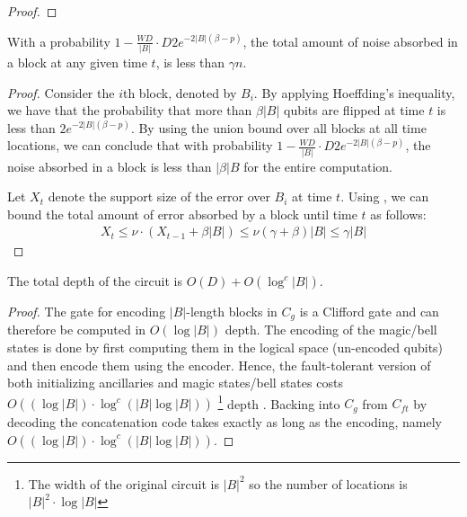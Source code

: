 \documentclass[manuscript,screen,review]{acmart}
\begin{document}
{\begin{proof}
\end{proof}

\begin{claim}
  \label{claim:prob}
  With a probability $ 1 - \frac{WD}{|B|} \cdot D 2e^{-2|B|(\beta - p)} $, the total amount of noise absorbed in a block at any given time $t$, is less than $\gamma n$. 
\end{claim}
\begin{proof}
Consider the $i$th block, denoted by $B_{i}$. By applying Hoeffding's inequality, we have that the probability that more than $\beta |B|$ qubits are flipped at time $t$ is less than $2e^{-2|B|(\beta - p)}$. By using the union bound over all blocks at all time locations, we can conclude that with probability $1 - \frac{WD}{|B|} \cdot D 2e^{-2|B|(\beta - p)}$, the noise absorbed in a block is less than $|\beta|B$ for the entire computation.

Let $X_{t}$ denote the support size of the error over $B_{i}$ at time $t$. Using , we can bound the total amount of error absorbed by a block until time $t$ as follows:
\begin{equation*}
\begin{split}
X_{t} \le \nu \cdot (X_{t-1} + \beta |B| ) \le \nu(\gamma+\beta) |B| \le \gamma |B|
\end{split}
\end{equation*}
\end{proof}


\begin{claim}
  The total depth of the circuit is $O ( D  ) + O ( \log^{c} |B| )$. 
\end{claim}
\begin{proof}
  The gate for encoding $|B|$-length blocks in $C_{g}$ is a Clifford gate and can therefore be computed in $O(\log|B|)$ depth. The encoding of the magic/bell states is done by first computing them in the logical space (un-encoded qubits) and then encode them using the encoder. Hence, the fault-tolerant version of both initializing ancillaries and magic states/bell states costs $O( (\log |B|) \cdot \log^{c}( |B| \log |B| ) )$ \footnote{The width of the original circuit is $|B|^{2}$ so the number of locations is $ |B|^{2} \cdot \log |B|$} depth \cite{aharonov1999faulttolerant}. Backing into $C_{g}$ from $C_{ft}$ by decoding the concatenation code takes exactly as long as the encoding, namely $O( (\log |B|) \cdot \log^{c}( |B| \log |B| ) )$.


\end{proof}}
\end{document}
